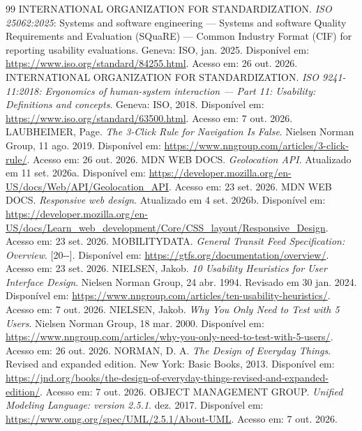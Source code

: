 \documentclass[12pt,oneside,a4paper,brazil,chapter=TITLE]{abntex2}
\begin{document}
\begin{thebibliography}{99}
 INTERNATIONAL ORGANIZATION FOR STANDARDIZATION. \textit{ISO 25062:2025}: Systems and software engineering --- Systems and software Quality Requirements and Evaluation (SQuaRE) --- Common Industry Format (CIF) for reporting usability evaluations. Geneva: ISO, jan. 2025. Disponível em: \url{https://www.iso.org/standard/84255.html}. Acesso em: 26 out. 2026.
 INTERNATIONAL ORGANIZATION FOR STANDARDIZATION. \textit{ISO 9241-11:2018: Ergonomics of human-system interaction --- Part 11: Usability: Definitions and concepts}. Geneva: ISO, 2018. Disponível em: \url{https://www.iso.org/standard/63500.html}. Acesso em: 7 out. 2026.
 LAUBHEIMER, Page. \textit{The 3-Click Rule for Navigation Is False}. Nielsen Norman Group, 11 ago. 2019. Disponível em: \url{https://www.nngroup.com/articles/3-click-rule/}. Acesso em: 26 out. 2026.
 MDN WEB DOCS. \textit{Geolocation API}. Atualizado em 11 set. 2026a. Disponível em: \url{https://developer.mozilla.org/en-US/docs/Web/API/Geolocation_API}. Acesso em: 23 set. 2026.
 MDN WEB DOCS. \textit{Responsive web design}. Atualizado em 4 set. 2026b. Disponível em: \url{https://developer.mozilla.org/en-US/docs/Learn_web_development/Core/CSS_layout/Responsive_Design}. Acesso em: 23 set. 2026.
 MOBILITYDATA. \textit{General Transit Feed Specification: Overview}. [20\mbox{-}\mbox{-}]. Disponível em: \url{https://gtfs.org/documentation/overview/}. Acesso em: 23 set. 2026.
 NIELSEN, Jakob. \textit{10 Usability Heuristics for User Interface Design}. Nielsen Norman Group, 24 abr. 1994. Revisado em 30 jan. 2024. Disponível em: \url{https://www.nngroup.com/articles/ten-usability-heuristics/}. Acesso em: 7 out. 2026.
 NIELSEN, Jakob. \textit{Why You Only Need to Test with 5 Users}. Nielsen Norman Group, 18 mar. 2000. Disponível em: \url{https://www.nngroup.com/articles/why-you-only-need-to-test-with-5-users/}. Acesso em: 26 out. 2026.
 NORMAN, D. A. \textit{The Design of Everyday Things}. Revised and expanded edition. New York: Basic Books, 2013. Disponível em: \url{https://jnd.org/books/the-design-of-everyday-things-revised-and-expanded-edition/}. Acesso em: 7 out. 2026.
 OBJECT MANAGEMENT GROUP. \textit{Unified Modeling Language: version 2.5.1}. dez. 2017. Disponível em: \url{https://www.omg.org/spec/UML/2.5.1/About-UML}. Acesso em: 7 out. 2026.

\end{thebibliography}
\end{document}
